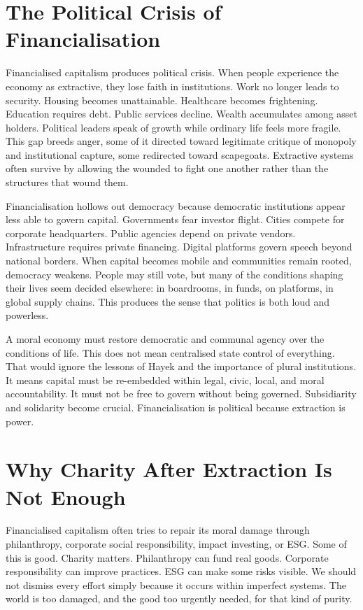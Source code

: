 \documentclass[11pt,a4paper,oneside]{book}
\begin{document}
\section*{The Political Crisis of Financialisation}

Financialised capitalism produces political crisis. When people experience the economy as extractive, they lose faith in institutions. Work no longer leads to security. Housing becomes unattainable. Healthcare becomes frightening. Education requires debt. Public services decline. Wealth accumulates among asset holders. Political leaders speak of growth while ordinary life feels more fragile. This gap breeds anger, some of it directed toward legitimate critique of monopoly and institutional capture, some redirected toward scapegoats. Extractive systems often survive by allowing the wounded to fight one another rather than the structures that wound them.

Financialisation hollows out democracy because democratic institutions appear less able to govern capital. Governments fear investor flight. Cities compete for corporate headquarters. Public agencies depend on private vendors. Infrastructure requires private financing. Digital platforms govern speech beyond national borders. When capital becomes mobile and communities remain rooted, democracy weakens. People may still vote, but many of the conditions shaping their lives seem decided elsewhere: in boardrooms, in funds, on platforms, in global supply chains. This produces the sense that politics is both loud and powerless.

A moral economy must restore democratic and communal agency over the conditions of life. This does not mean centralised state control of everything. That would ignore the lessons of Hayek and the importance of plural institutions. It means capital must be re-embedded within legal, civic, local, and moral accountability. It must not be free to govern without being governed. Subsidiarity and solidarity become crucial. Financialisation is political because extraction is power.

\section*{Why Charity After Extraction Is Not Enough}

Financialised capitalism often tries to repair its moral damage through philanthropy, corporate social responsibility, impact investing, or ESG. Some of this is good. Charity matters. Philanthropy can fund real goods. Corporate responsibility can improve practices. ESG can make some risks visible. We should not dismiss every effort simply because it occurs within imperfect systems. The world is too damaged, and the good too urgently needed, for that kind of purity.
\end{document}
